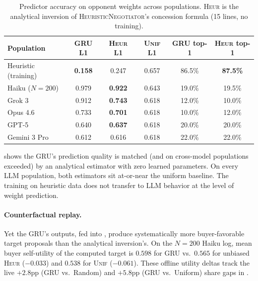 \documentclass[11pt,a4paper]{article}
\begin{document}
\begin{table}[h]
\centering
\caption{Predictor accuracy on opponent weights across populations. \textsc{Heur} is the analytical inversion of \textsc{HeuristicNegotiator}'s concession formula (15 lines, no training).}
\label{tab:bias_scalar_predict}
\small
\begin{tabular}{lccccc}
\toprule
Population & GRU L1 & \textsc{Heur} L1 & \textsc{Unif} L1 & GRU top-1 & \textsc{Heur} top-1 \\
\midrule
Heuristic (training) & \textbf{0.158} & 0.247 & 0.657 & 86.5\% & \textbf{87.5\%} \\
Haiku ($N\!=\!200$) & 0.979 & \textbf{0.922} & 0.643 & 19.0\% & 19.5\% \\
Grok 3 & 0.912 & \textbf{0.743} & 0.618 & 12.0\% & 10.0\% \\
Opus 4.6 & 0.733 & \textbf{0.701} & 0.618 & 10.0\% & 12.0\% \\
GPT-5 & 0.640 & \textbf{0.637} & 0.618 & 20.0\% & 20.0\% \\
Gemini 3 Pro & 0.612 & 0.616 & 0.618 & 22.0\% & 22.0\% \\
\bottomrule
\end{tabular}
\end{table}

 shows the GRU's prediction quality is matched (and on cross-model populations exceeded) by an analytical estimator with zero learned parameters. On every LLM population, both estimators sit at-or-near the uniform baseline. The training on heuristic data does not transfer to LLM behavior at the level of weight prediction.

\paragraph{Counterfactual replay.} Yet the GRU's outputs, fed into , produce systematically more buyer-favorable target proposals than the analytical inversion's. On the $N\!=\!200$ Haiku log, mean buyer self-utility of the computed target is $0.598$ for GRU vs.\ $0.565$ for unbiased \textsc{Heur} ($-0.033$) and $0.538$ for \textsc{Unif} ($-0.061$). These offline utility deltas track the live $+2.8$pp (GRU vs.\ Random) and $+5.8$pp (GRU vs.\ Uniform) share gaps in .
\end{document}
